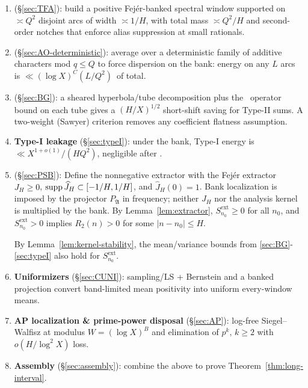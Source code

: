 \begin{enumerate}[leftmargin=*,itemsep=0.25em]
  \item \textbf{\TFA} (\S\ref{sec:TFA}): build a positive Fej\'er-banked spectral window supported on $\asymp Q^2$ disjoint arcs of width $\asymp 1/H$, with total mass $\asymp Q^2/H$ and second-order notches that enforce alias suppression at small rationals.
  \item \textbf{\AO} (\S\ref{sec:AO-deterministic}): average over a deterministic family of additive characters mod $q\le Q$ to force dispersion on the bank: energy on any $L$ arcs is $\ll (\log X)^C(L/Q^2)\,$ of total.
  \item \textbf{\BG} (\S\ref{sec:BG}): a sheared hyperbola/tube decomposition plus the \SSU\ operator bound on each tube gives a $(H/X)^{1/2}$ short-shift saving for Type-II sums. A two-weight (Sawyer) criterion removes any coefficient flatness assumption.
  \item \textbf{Type-I leakage} (\S\ref{sec:typeI}): under the bank, Type-I energy is $\ll X^{1+o(1)}/(HQ^2)$, negligible after \AO.
  
  \item \textbf{\PSB} (\S\ref{sec:PSB}): Define the nonnegative extractor with the Fejér extractor $J_H\ge 0$, $\operatorname{supp}\widehat J_H\subset[-1/H,1/H]$, and $\widehat J_H(0)=1$.
Bank localization is imposed by the projector $P_{\mathfrak A}$ in frequency; neither $J_H$ nor the analysis kernel is multiplied by the bank.
By Lemma~\ref{lem:extractor}, $S^{\mathrm{ext}}_{n_0}\ge 0$ for all $n_0$, and $S^{\mathrm{ext}}_{n_0}>0$ implies $R_2(n)>0$ for some $|n-n_0|\le H$.

By Lemma~\ref{lem:kernel-stability}, the mean/variance bounds from \ref{sec:BG}-\ref{sec:typeI} also hold for $S^{\mathrm{ext}}_{n_0}$.
  
  \item \textbf{Uniformizers} (\S\ref{sec:CUNI}): sampling/LS + Bernstein and a banked projection convert band-limited mean positivity into uniform every-window means.
  \item \textbf{AP localization \& prime-power disposal} (\S\ref{sec:AP}): log-free Siegel--Walfisz at modulus $W=(\log X)^B$ and elimination of $p^k,\,k\ge2$ with $o(H/\log^2 X)$ loss.
  \item \textbf{Assembly} (\S\ref{sec:assembly}): combine the above to prove Theorem~\ref{thm:long-interval}.
\end{enumerate}

